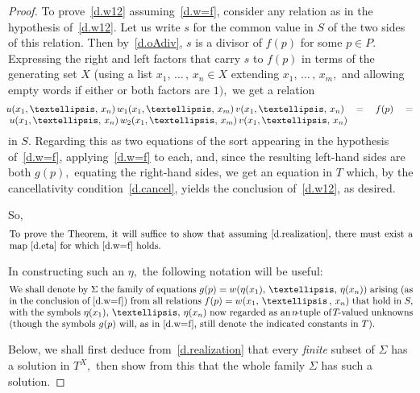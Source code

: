 \documentclass[10pt,a4paper]{amsart}
\begin{document}
\begin{proof}
To prove~\eqref{d.w12} assuming~\eqref{d.w=f}, consider
any relation as in the hypothesis of~\eqref{d.w12}.
Let us write $s$ for the common value in $S$
of the two sides of this relation.
Then by~\eqref{d.oAdiv},
$s$ is a divisor of $f(p)$ for some $p\in P.$
Expressing the right and left factors that
carry $s$ to $f(p)$ in terms of
the generating set $X$ (using a list $x_1,\,\dots\,,\,x_n\in X$
extending $x_1,\,\dots\,,\,x_m,$ and allowing empty words
if either or both factors are $1),$ we get a relation
%
\begin{equation}\begin{minipage}[c]{35pc}\label{d.uw12v}
$\!\!u(x_1,\dots,\,x_n)\,w_1(x_1,\dots,\,x_m)\,
v(x_1,\dots,\,x_n) = f(p) =
u(x_1,\dots,\,x_n)\,w_2(x_1,\dots,\,x_m)\,v(x_1,\dots,\,x_n)\!\!$
\end{minipage}\end{equation}
%
in $S.$
Regarding this as two equations of the sort appearing
in the hypothesis of~\eqref{d.w=f}, applying~\eqref{d.w=f}
to each, and, since the resulting left-hand sides
are both $g(p),$ equating the right-hand sides,
we get an equation in $T$ which,
by the cancellativity condition~\eqref{d.cancel},
yields the conclusion of~\eqref{d.w12}, as desired.

So,
%
\begin{equation}\begin{minipage}[c]{35pc}\label{d.iff}
To prove the Theorem, it will suffice to show that
assuming~\eqref{d.realization},
there must exist a map~\eqref{d.eta} for which~\eqref{d.w=f} holds.
\end{minipage}\end{equation}
%

In constructing such an $\eta,$
the following notation will be useful:
%
\begin{equation}\begin{minipage}[c]{35pc}\label{d.Sigma}
We shall denote by $\Sigma$ the family of equations
$g(p)=w(\eta(x_1),\,\dots,\,\eta(x_n))$ arising
(as in the conclusion of~\eqref{d.w=f})
from all relations $f(p)=w(x_1,\,\dots\,,\,x_n)$ that
hold in $S,$ with the symbols $\eta(x_1),\,\dots,\,\eta(x_n)$
now regarded as an $\!n\!$-tuple of $\!T\!$-valued unknowns
(though the symbols $g(p)$ will, as in~\eqref{d.w=f},
still denote the indicated constants in~$T).$
\end{minipage}\end{equation}

Below, we shall first deduce from~\eqref{d.realization} that
every {\em finite} subset of $\Sigma$ has a solution
in $T^X,$ then show from this that the whole family $\Sigma$
has such a solution.


\end{proof}
\end{document}
